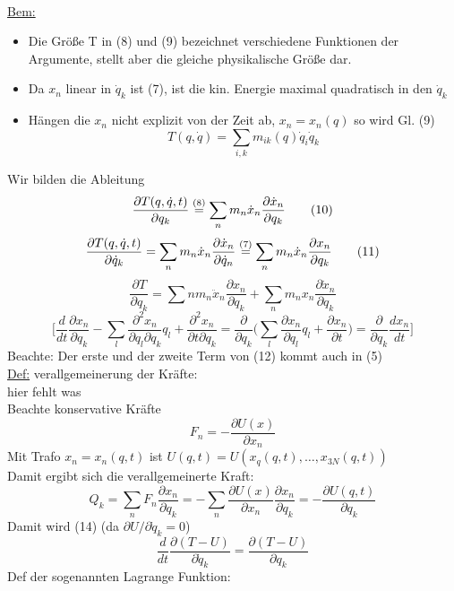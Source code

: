\documentclass[titlepage,12pt,a4paper,ngerman]{report}
\begin{document}
{\begin{align*}
\end{align*}
\underline{Bem:} \begin{itemize}
	\item Die Größe T in (8) und (9) bezeichnet verschiedene Funktionen der Argumente, stellt aber die gleiche physikalische Größe dar.
	\item Da $ x_n $ linear in $ \dot{q}_k $ ist (7), ist die kin. Energie maximal quadratisch in den $ \dot{q}_k $
	\item Hängen die $ x_n $ nicht explizit von der Zeit ab, $ x_n = x_n (q) $ so wird Gl. (9)
	$$ T ( q, \dot{q}) = \sum_{i,k} m_{ik} (q) \dot{q}_i \dot{q}_k$$
\end{itemize}
Wir bilden die Ableitung
\begin{equation*}
\frac{\partial T(q,\dot{q},t)}{\partial q_k} \buildrel (8) \over = \sum_n m_n \dot{x}_n \frac{\partial \dot{x}_n}{\partial q_k} \tag{10}
\end{equation*}
\begin{equation*}
\frac{\partial T(q,\dot{q},t)}{\partial \dot{q}_k} = \sum_n m_n \dot{x}_n \frac{\partial \dot{x}_n}{\partial \dot{q}_n} \buildrel (7) \over = \sum_n m_n \dot{x}_n \frac{\partial  x_n}{\partial q_k} \tag{11}
\end{equation*}
\begin{equation*}
\frac{\partial T}{\partial q_k} = \sum n m_n \ddot{x}_n \frac{\partial x_n}{\partial q_k} + \sum_n m_n x_n \frac{\partial \dot{x}_n}{\partial q_k} \tag{12}
\end{equation*}
$$ \bigg[ \frac{d}{dt} \frac{\partial x_n}{\partial q_k} - \sum_l \frac{\partial^2 x_n}{\partial q_l \partial q_k } q_l + \frac{\partial^2 x_n}{\partial t \partial q_k} = \frac{\partial}{\partial q_k} \bigg( \sum_l \frac{\partial x_n}{\partial q_l} q_l + \frac{\partial x_n}{\partial t} \bigg) = \frac{\partial }{\partial q_k} \frac{d x_n}{dt} \bigg]$$
Beachte: Der erste und der zweite Term von (12) kommt auch in (5)\\
\underline{Def:} verallgemeinerung der Kräfte:\\

hier fehlt was\\


Beachte konservative Kräfte
$$ F_n = - \frac{\partial U(x)}{\partial x_n} $$
Mit Trafo $ x_n = x_n (q,t)  $ ist $ U(q,t) = U ( x_q(q,t),\dots , x_{3N} (q,t)) $\\
Damit ergibt sich die verallgemeinerte Kraft:
\begin{equation*}
Q_k = \sum_n F_n \frac{\partial x_n}{\partial q_k} = - \sum_n \frac{\partial U(x)}{\partial x_n} \frac{\partial x_n}{\partial q_k} = - \frac{\partial U(q,t)}{\partial q_k} \tag{15}
\end{equation*}
Damit wird (14) (da $ \partial U / \partial \dot{q}_k = 0 $)
\begin{equation*}
\frac{d}{dt} \frac{\partial (T-U)}{\partial \dot{q}_k} = \frac{\partial (T-U)}{\partial q_k} \tag{16}
\end{equation*}
Def der sogenannten Lagrange Funktion:

}
\end{document}
